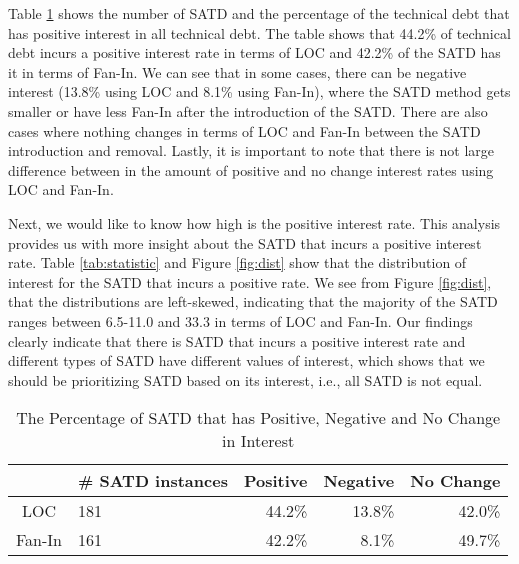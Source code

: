 
Table \ref{tab:percentage} shows the number of SATD and the percentage of the technical debt that has positive interest in all technical debt. The table shows that 44.2\% of technical debt incurs a positive interest rate in terms of LOC and 42.2\% of the SATD has it in terms of Fan-In. We can see that in some cases, there can be negative interest (13.8\% using LOC and 8.1\% using Fan-In), where the SATD method gets smaller or have less Fan-In after the introduction of the SATD. There are also cases where nothing changes in terms of LOC and Fan-In between the SATD introduction and removal. Lastly, it is important to note that there is not large difference between in the amount of positive and no change interest rates using LOC and Fan-In. 

Next, we would like to know how high is the positive interest rate. This analysis provides us with more insight about the SATD that incurs a positive interest rate.
Table \ref{tab:statistic} and Figure \ref{fig:dist} show that the distribution of interest for the SATD that incurs a positive rate. We see from Figure \ref{fig:dist}, that the distributions are left-skewed, indicating that the majority of the SATD ranges between 6.5-11.0 and 33.3 in terms of LOC and Fan-In. Our findings clearly indicate that there is SATD that incurs a positive interest rate and different types of SATD have different values of interest, which shows that we should be prioritizing SATD based on its interest, i.e., all SATD is not equal.



\begin{table}[tb]
  \caption{The Percentage of SATD that has Positive, Negative and No Change in Interest}
  \label{tab:percentage}
  \centering

  \begin{tabular}{c|p{0.45in}|rrr}
  \hline
        & \textbf{\# SATD instances} & \textbf{Positive} & \textbf{Negative} & \textbf{No Change} \\
  \hline
   LOC  & 181 &  44.2\%  &  13.8\% & 42.0\%\\
Fan-In  & 161 &  42.2\%  &  8.1\% & 49.7\%\\
  \hline
  \end{tabular}
\end{table}

